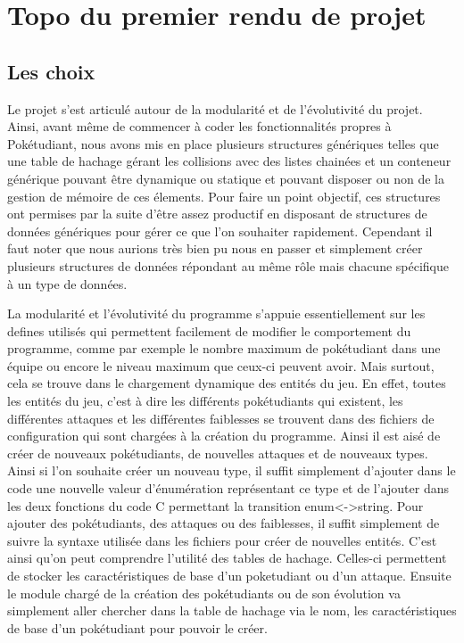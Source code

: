 \documentclass[10pt,a4paper,twocolumn]{report}
\begin{document}
\chapter{Topo du premier rendu de projet}

\section{Les choix}

Le projet s'est articulé autour de la modularité et de l'évolutivité du projet.
Ainsi, avant même de commencer à coder les fonctionnalités propres à Pokétudiant, nous avons
mis en place plusieurs structures génériques telles que une table de hachage gérant les collisions avec des listes chainées et un conteneur générique pouvant être dynamique ou statique et pouvant disposer ou non de la gestion de mémoire de ces élements.
Pour faire un point objectif, ces structures ont permises par la suite d'être assez productif en disposant de structures de données génériques pour gérer ce que l'on souhaiter rapidement. Cependant il faut noter que nous aurions très bien pu nous en passer et simplement créer plusieurs structures de données répondant au même rôle mais chacune spécifique à un type de données.

La modularité et l'évolutivité du programme s'appuie essentiellement sur les defines utilisés qui permettent facilement de modifier le comportement du programme, comme par exemple le nombre maximum de pokétudiant dans une équipe ou encore le niveau maximum que ceux-ci peuvent avoir.
Mais surtout, cela se trouve dans le chargement dynamique des entités du jeu.
En effet, toutes les entités du jeu, c'est à dire les différents pokétudiants qui existent, les différentes attaques et les différentes faiblesses se trouvent dans des fichiers de configuration qui sont chargées à la création du programme. Ainsi il est aisé de créer de nouveaux pokétudiants, de nouvelles attaques et de nouveaux types.
Ainsi si l'on souhaite créer un nouveau type, il suffit simplement d'ajouter dans le code une nouvelle valeur d'énumération représentant ce type et de l'ajouter dans les deux fonctions du code C permettant la transition enum<->string.
Pour ajouter des pokétudiants, des attaques ou des faiblesses, il suffit simplement de suivre la syntaxe utilisée dans les fichiers pour créer de nouvelles entités.
C'est ainsi qu'on peut comprendre l'utilité des tables de hachage. Celles-ci permettent de stocker les caractéristiques de base d'un poketudiant ou d'un attaque. Ensuite le module chargé de la création des pokétudiants ou de son évolution va simplement aller chercher dans la table de hachage via le nom, les caractéristiques de base d'un pokétudiant pour pouvoir le créer.
\end{document}
